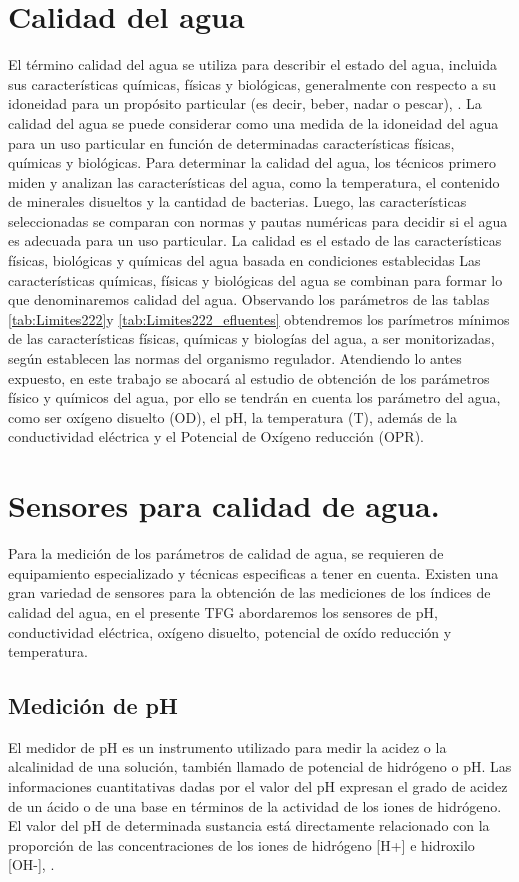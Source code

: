 \section{Calidad del agua}
El t\'ermino calidad del agua se utiliza para describir el estado del agua, incluida sus caracter\'isticas químicas, físicas y biológicas, generalmente con respecto a su idoneidad para un propósito particular (es decir, beber, nadar o pescar), \cite{waterquality}.
La calidad del agua se puede considerar como una medida de la idoneidad del agua para un uso particular en funci\'on de determinadas caracter\'isticas f\'isicas, qu\'imicas y biol\'ogicas. 
Para determinar la calidad del agua, los t\'ecnicos primero miden y analizan las caracter\'isticas del agua, como la temperatura, el contenido de minerales disueltos y la cantidad de bacterias. 
Luego, las caracter\'isticas seleccionadas se comparan con normas y pautas num\'ericas para decidir si el agua es adecuada para un uso particular. 
La calidad es el estado de las caracter\'isticas f\'isicas, biol\'ogicas y qu\'imicas del agua basada en condiciones establecidas
Las caracter\'isticas qu\'imicas, f\'isicas y biol\'ogicas del agua se combinan para formar lo que denominaremos calidad del agua.
Observando los par\'ametros de las tablas \ref{tab:Limites222}y \ref{tab:Limites222_efluentes} obtendremos los par\'imetros m\'inimos de las caracter\'isticas f\'isicas, qu\'imicas y biolog\'ias del agua, a ser monitorizadas, seg\'un establecen las normas del organismo regulador. 
Atendiendo lo antes expuesto, en este trabajo se abocar\'a al estudio de obtenci\'on de los par\'ametros f\'isico y qu\'imicos del agua, por ello se tendr\'an en cuenta los  par\'ametro del agua, como ser ox\'igeno disuelto (OD), el pH, la temperatura (T), adem\'as de la conductividad el\'ectrica y el Potencial de Ox\'igeno reducci\'on (OPR). 
\section{Sensores para calidad de agua.}
Para la medici\'on de los par\'ametros de calidad de agua, se requieren de equipamiento especializado y t\'ecnicas especificas a tener en cuenta.
Existen una gran variedad de sensores para la obtención de las mediciones de los \'indices de calidad del agua, en el presente TFG abordaremos los sensores de pH, conductividad el\'ectrica, ox\'igeno disuelto, potencial de ox\'ido reducción y temperatura. 
\subsection{Medición de pH}
El medidor de pH es un instrumento utilizado para medir la acidez o la alcalinidad de una solución, también llamado de potencial de hidrógeno o pH. 
Las informaciones cuantitativas dadas por el valor del pH expresan el grado de acidez de un \'acido o de una base en t\'erminos de la actividad de los iones de hidr\'ogeno. El valor del pH de determinada sustancia est\'a directamente relacionado con la proporci\'on de las concentraciones de los iones de hidrógeno [H+] e hidroxilo [OH-], \cite{omega_medidores_nodate}.

